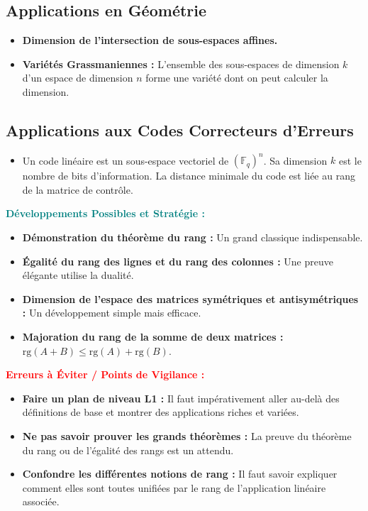 \documentclass[12pt, a4paper, parskip=full]{report}
\theoremstyle{agregstyle}
\newenvironment{developpements}
  {\par\medskip\noindent\begin{oframed}\noindent\textbf{\textcolor{teal}{Développements Possibles et Stratégie :}}}
  {\end{oframed}\par\medskip}
\newenvironment{erreurs}
  {\par\medskip\noindent\begin{oframed}\noindent\textbf{\textcolor{red}{Erreurs à Éviter / Points de Vigilance :}}}
  {\end{oframed}\par\medskip}
\begin{document}
\subsection{Applications en Géométrie}
\begin{itemize}
    \item \textbf{Dimension de l'intersection de sous-espaces affines.}
    \item \textbf{Variétés Grassmaniennes :} L'ensemble des sous-espaces de dimension $k$ d'un espace de dimension $n$ forme une variété dont on peut calculer la dimension.
\end{itemize}
\subsection{Applications aux Codes Correcteurs d'Erreurs}
\begin{itemize}
    \item Un code linéaire est un sous-espace vectoriel de $(\mathbb{F}_q)^n$. Sa dimension $k$ est le nombre de bits d'information. La distance minimale du code est liée au rang de la matrice de contrôle.
\end{itemize}

\begin{developpements}
    \begin{itemize}
        \item \textbf{Démonstration du théorème du rang :} Un grand classique indispensable.
        \item \textbf{Égalité du rang des lignes et du rang des colonnes :} Une preuve élégante utilise la dualité.
        \item \textbf{Dimension de l'espace des matrices symétriques et antisymétriques :} Un développement simple mais efficace.
        \item \textbf{Majoration du rang de la somme de deux matrices :} $\mathrm{rg}(A+B) \le \mathrm{rg}(A)+\mathrm{rg}(B)$.
    \end{itemize}
\end{developpements}

\begin{erreurs}
    \begin{itemize}
        \item \textbf{Faire un plan de niveau L1 :} Il faut impérativement aller au-delà des définitions de base et montrer des applications riches et variées.
        \item \textbf{Ne pas savoir prouver les grands théorèmes :} La preuve du théorème du rang ou de l'égalité des rangs est un attendu.
        \item \textbf{Confondre les différentes notions de rang :} Il faut savoir expliquer comment elles sont toutes unifiées par le rang de l'application linéaire associée.
    \end{itemize}
\end{erreurs}
\end{document}
